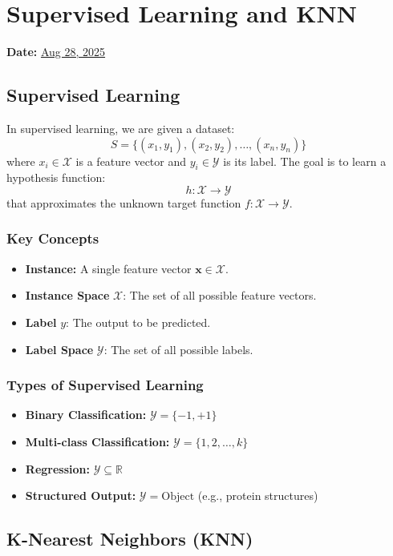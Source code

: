 \section{Supervised Learning and KNN}
\textbf{Date:} \underline{Aug 28, 2025}

\subsection{Supervised Learning}

In supervised learning, we are given a dataset:
\[
S = \{ (x_1, y_1), (x_2, y_2), \dots, (x_n, y_n) \}
\]
where $x_i \in \mathcal{X}$ is a feature vector and $y_i \in \mathcal{Y}$ is its label.  
The goal is to learn a hypothesis function:
\[
h: \mathcal{X} \to \mathcal{Y}
\]
that approximates the unknown target function $f: \mathcal{X} \to \mathcal{Y}$.

\subsubsection*{Key Concepts}
\begin{itemize}
    \item \textbf{Instance:} A single feature vector $\mathbf{x} \in \mathcal{X}$.
    \item \textbf{Instance Space} $\mathcal{X}$: The set of all possible feature vectors.
    \item \textbf{Label} $y$: The output to be predicted.
    \item \textbf{Label Space} $\mathcal{Y}$: The set of all possible labels.
\end{itemize}

\subsubsection*{Types of Supervised Learning}
\begin{itemize}
    \item \textbf{Binary Classification:} $\mathcal{Y} = \{-1, +1\}$
    \item \textbf{Multi-class Classification:} $\mathcal{Y} = \{1, 2, \dots, k\}$
    \item \textbf{Regression:} $\mathcal{Y} \subseteq \mathbb{R}$
    \item \textbf{Structured Output:} $\mathcal{Y} = \text{Object}$ (e.g., protein structures)
\end{itemize}

\subsection{K-Nearest Neighbors (KNN)}

